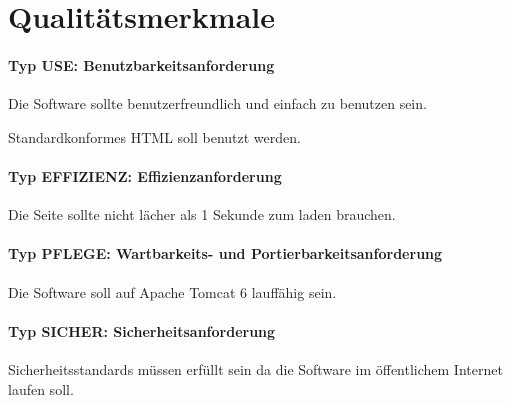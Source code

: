 \section{Qualitätsmerkmale}

\paragraph{Typ USE: Benutzbarkeitsanforderung}

\begin{asparaitem}
\item Die Software sollte benutzerfreundlich und einfach zu benutzen sein.
\item Standardkonformes HTML soll benutzt werden.
\end{asparaitem}

\paragraph{Typ EFFIZIENZ: Effizienzanforderung}

\begin{asparaitem}
\item Die Seite sollte nicht lächer als 1 Sekunde zum laden brauchen.
\end{asparaitem}

\paragraph{Typ PFLEGE: Wartbarkeits- und Portierbarkeitsanforderung}

\begin{asparaitem}
\item Die Software soll auf Apache Tomcat 6 lauffähig sein.
\end{asparaitem}

\paragraph{Typ SICHER: Sicherheitsanforderung}

\begin{asparaitem}
\item Sicherheitsstandards müssen erfüllt sein da die Software im öffentlichem Internet laufen soll.
\end{asparaitem}

